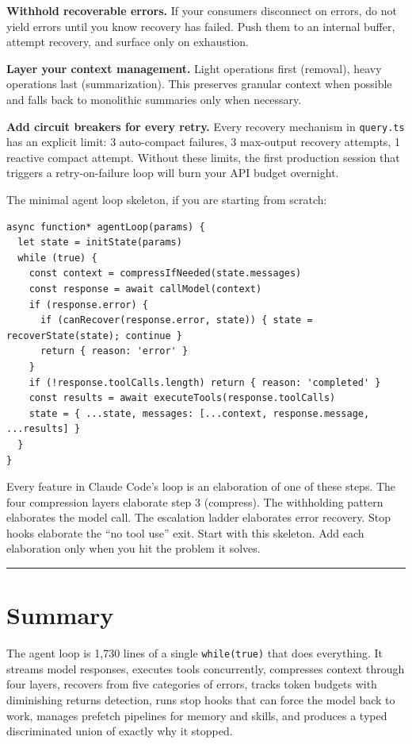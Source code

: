\documentclass[
  english,
  11pt,
  letterpaper,
]{book}
\begin{document}
\textbf{Withhold recoverable errors.} If your consumers disconnect on
errors, do not yield errors until you know recovery has failed. Push
them to an internal buffer, attempt recovery, and surface only on
exhaustion.

\textbf{Layer your context management.} Light operations first
(removal), heavy operations last (summarization). This preserves
granular context when possible and falls back to monolithic summaries
only when necessary.

\textbf{Add circuit breakers for every retry.} Every recovery mechanism
in \texttt{query.ts} has an explicit limit: 3 auto-compact failures, 3
max-output recovery attempts, 1 reactive compact attempt. Without these
limits, the first production session that triggers a retry-on-failure
loop will burn your API budget overnight.

The minimal agent loop skeleton, if you are starting from scratch:

\begin{verbatim}
async function* agentLoop(params) {
  let state = initState(params)
  while (true) {
    const context = compressIfNeeded(state.messages)
    const response = await callModel(context)
    if (response.error) {
      if (canRecover(response.error, state)) { state = recoverState(state); continue }
      return { reason: 'error' }
    }
    if (!response.toolCalls.length) return { reason: 'completed' }
    const results = await executeTools(response.toolCalls)
    state = { ...state, messages: [...context, response.message, ...results] }
  }
}
\end{verbatim}

Every feature in Claude Code's loop is an elaboration of one of these
steps. The four compression layers elaborate step 3 (compress). The
withholding pattern elaborates the model call. The escalation ladder
elaborates error recovery. Stop hooks elaborate the ``no tool use''
exit. Start with this skeleton. Add each elaboration only when you hit
the problem it solves.

\begin{center}\rule{0.5\linewidth}{0.5pt}\end{center}

\section{Summary}\label{summary}

The agent loop is 1,730 lines of a single \texttt{while(true)} that does
everything. It streams model responses, executes tools concurrently,
compresses context through four layers, recovers from five categories of
errors, tracks token budgets with diminishing returns detection, runs
stop hooks that can force the model back to work, manages prefetch
pipelines for memory and skills, and produces a typed discriminated
union of exactly why it stopped.
\end{document}
